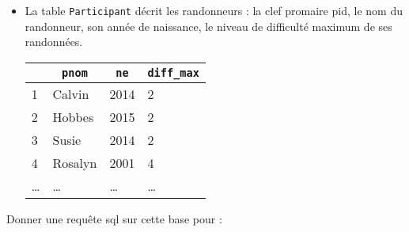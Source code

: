 \documentclass[11pt,a4paper]{article}
\begin{document}
\begin{Exercise}[title={Randonnée},origin={\bac \; d'après {\sc ccmp 2021 - pc, pc psi} (Partie 1)}]
\begin{itemize}
\begin{center}
\begin{tabular}{|l|l|l|l|l|}
				      \hline
			      \end{tabular}
		      \end{center}
		\item La table {\tt Participant} décrit les randonneurs : la clef promaire {\ttb pid}, le nom du randonneur, son année de naissance, le niveau de difficulté maximum de ses randonnées.
		      \begin{center}
			      \begin{tabular}{|l|l|l|l|}
				      \hline
				      \rowcolor{lightgray} \multicolumn{1}{|c|}{\ttb{\underline{pid}}} & \multicolumn{1}{|c|}{\textbf{\tt pnom}} & \multicolumn{1}{|c|}{\textbf{\tt ne}} & \multicolumn{1}{|c|}{\tt diff\_max} \\
				      \hline
				      1                                                                & Calvin                                  & 2014                                  & 2                                   \\
				      \hline
				      2                                                                & Hobbes                                  & 2015                                  & 2                                   \\
				      \hline
				      3                                                                & Susie                                   & 2014                                  & 2                                   \\
				      \hline
				      4                                                                & Rosalyn                                 & 2001                                  & 4                                   \\
				      \hline
				      \dots                                                            & \dots                                   & \dots                                 & \dots                               \\
				      \hline
			      \end{tabular}
		      \end{center}
	\end{itemize}
	Donner une requête {\sc sql} sur cette base pour :


\end{Exercise}
\end{document}
